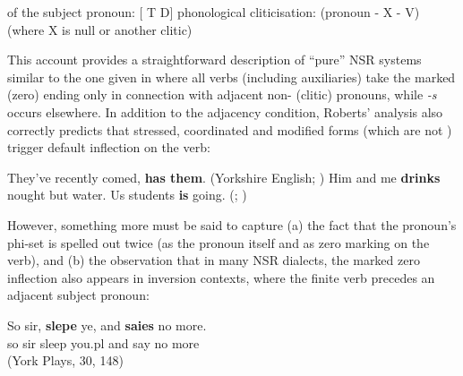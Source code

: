 \documentclass[output=paper]{langsci/langscibook}
\begin{document}
\ea
\ea {} of the subject pronoun: [ T D\tief{[+phi]}]
\ex phonological cliticisation: (pronoun - X - V) (where X is null or another clitic)
\z
\z

This account provides a straightforward description of ``pure''
\gls{NSR} systems similar to the one given in
 where all verbs (including auxiliaries) take the
marked (zero) ending only in connection with adjacent non-\Tsg{} (clitic)
pronouns, while \emph{-s} occurs elsewhere. In addition
to the adjacency condition, Roberts' analysis also correctly predicts that
stressed, coordinated and modified forms (which are not ) trigger
default inflection on the verb:

\ea
\ea They've recently comed, \textbf{has them}.
(Yorkshire English; \citealt[88]{Pietsch:2005b})
\ex Him and me \textbf{drinks} nought but water.
\parencite[6]{Roberts:2010}
\ex Us students \textbf{is} going.
(; \citealt[24]{Henry:1995})
\z
\z

However, something more must be said to capture (a) the fact that the pronoun's
phi-set is spelled out twice (as the pronoun itself and as zero marking on the
verb), and (b) the observation that in many \gls{NSR}
dialects, the marked zero inflection also appears in inversion contexts, where
the finite verb precedes an adjacent subject pronoun:

\ea
\gll So sir, \textbf{slepe} ye, and \textbf{saies} no more.\\
so sir sleep you.pl and say no more\\
\glt (York Plays, 30, 148)
\z
\end{document}
